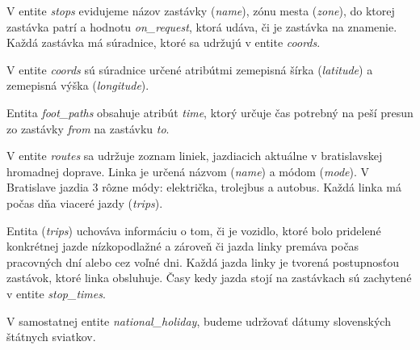 V entite \textit{stops} evidujeme názov zastávky (\textit{name}), zónu mesta (\textit{zone}), do ktorej zastávka patrí a hodnotu \textit{on\_request}, ktorá udáva, či je zastávka na znamenie. Každá zastávka má súradnice, ktoré sa udržujú v entite \textit{coords}.

V entite \textit{coords} sú súradnice určené atribútmi zemepisná šírka (\textit{latitude}) a zemepisná výška (\textit{longitude}). 

Entita \textit{foot\_paths} obsahuje atribút \textit{time}, ktorý určuje čas potrebný na peší presun zo zastávky \textit{from} na zastávku \textit{to}.

V entite \textit{routes} sa udržuje zoznam liniek, jazdiacich aktuálne v bratislavskej hromadnej doprave. Linka je určená názvom (\textit{name}) a módom (\textit{mode}). V Bratislave jazdia 3 rôzne módy: električka, trolejbus a autobus. Každá linka má počas dňa viaceré jazdy (\textit{trips}).

Entita (\textit{trips}) uchováva informáciu o tom, či je vozidlo, ktoré bolo pridelené konkrétnej jazde nízkopodlažné a zároveň či jazda linky premáva počas pracovných dní alebo cez voľné dni. Každá jazda linky je tvorená postupnosťou zastávok, ktoré linka obsluhuje. Časy kedy jazda stojí na zastávkach sú zachytené v entite \textit{stop\_times}. 

V samostatnej entite \textit{national\_holiday}, budeme udržovať dátumy slovenských štátnych sviatkov.

